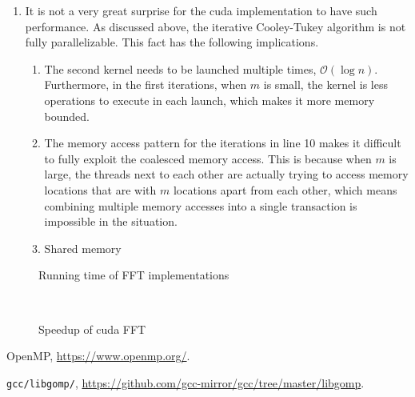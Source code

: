 \documentclass[amsmath,amssymb]{revtex4}
\begin{document}
\begin{enumerate}
\item It is not a very great surprise for the cuda implementation to have such performance. As discussed above, the iterative Cooley-Tukey algorithm is not fully parallelizable. This fact has the following implications.
\begin{enumerate}
\item The second kernel needs to be launched multiple times, $\mathcal{O}(\log n)$. Furthermore, in the first iterations, when $m$ is small, the kernel is less operations to execute in each launch, which makes it more memory bounded.
\item The memory access pattern for the iterations in line 10 makes it difficult to fully exploit the coalesced memory access. This is because when $m$ is large, the threads next to each other are actually trying to access memory locations that are with $m$ locations apart from each other, which means combining multiple memory accesses into a single transaction is impossible in the situation.
\item Shared memory
\end{enumerate}
\end{enumerate}

\begin{figure}[h]
  \centering
  \begin{minipage}[b]{0.45\textwidth}

\caption{\label{fig:fig3}Running time of FFT implementations}
\end{minipage}
~
\begin{minipage}[b]{0.45\textwidth}
\caption{\label{fig:fig4}Speedup of cuda FFT}
\end{minipage}
\end{figure}





\medskip

\begin{thebibliography}{9}

OpenMP, \url{https://www.openmp.org/}.

{\tt gcc/libgomp/}, \url{https://github.com/gcc-mirror/gcc/tree/master/libgomp}.


\end{thebibliography}
\end{document}
